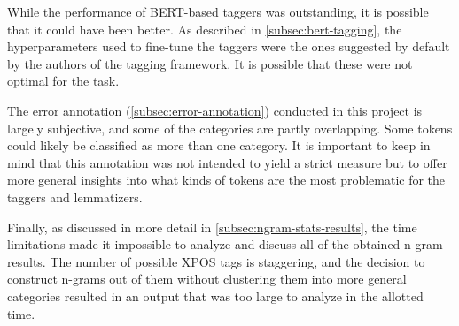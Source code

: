 While the performance of BERT-based taggers was outstanding, it is possible that it could have been better. As described in \autoref{subsec:bert-tagging}, the hyperparameters used to fine-tune the taggers were the ones suggested by default by the authors of the tagging framework. It is possible that these were not optimal for the task.

The error annotation (\autoref{subsec:error-annotation}) conducted in this project is largely subjective, and some of the categories are partly overlapping. Some tokens could likely be classified as more than one category. It is important to keep in mind that this annotation was not intended to yield a strict measure but to offer more general insights into what kinds of tokens are the most problematic for the taggers and lemmatizers.

Finally, as discussed in more detail in \autoref{subsec:ngram-stats-results}, the time limitations made it impossible to analyze and discuss all of the obtained n-gram results. The number of possible XPOS tags is staggering, and the decision to construct n-grams out of them without clustering them into more general categories resulted in an output that was too large to analyze in the allotted time.